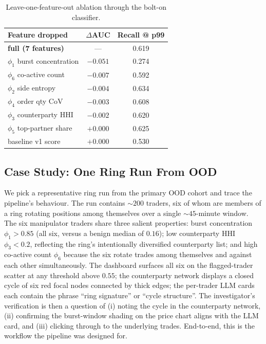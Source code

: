 \documentclass[10pt,twocolumn,letterpaper]{article}
\begin{document}
\begin{table}[t]
\caption{Leave-one-feature-out ablation through the bolt-on classifier.}
\label{tab:abl}
\centering
\footnotesize
\begin{tabular}{lcc}
\toprule
Feature dropped & $\Delta$AUC & Recall @ p99 \\
\midrule
\textbf{full (7 features)} & --- & 0.619 \\
$\phi_1$ burst concentration & $-0.051$ & 0.274 \\
$\phi_6$ co-active count & $-0.007$ & 0.592 \\
$\phi_2$ side entropy & $-0.004$ & 0.634 \\
$\phi_4$ order qty CoV & $-0.003$ & 0.608 \\
$\phi_3$ counterparty HHI & $-0.002$ & 0.620 \\
$\phi_5$ top-partner share & $+0.000$ & 0.625 \\
baseline v1 score & $+0.000$ & 0.530 \\
\bottomrule
\end{tabular}
\end{table}

\subsection{Case Study: One Ring Run From OOD}
\label{sec:case}
We pick a representative ring run from the primary OOD cohort and
trace the pipeline's behaviour. The run contains \(\sim\!200\)
traders, six of whom are members of a ring rotating positions among
themselves over a single \(\sim\!45\)-minute window. The six
manipulator traders share three salient properties: burst
concentration \(\phi_1 > 0.85\) (all six, versus a benign median of
\(0.16\)); low counterparty HHI \(\phi_3 < 0.2\), reflecting the
ring's intentionally diversified counterparty list; and high
co-active count \(\phi_6\) because the six rotate trades among
themselves and against each other simultaneously. The dashboard
surfaces all six on the flagged-trader scatter at any threshold above
\(0.55\); the counterparty network displays a closed cycle of six red
focal nodes connected by thick edges; the per-trader LLM cards each
contain the phrase ``ring signature'' or ``cycle structure''. The
investigator's verification is then a question of (i) noting the
cycle in the counterparty network, (ii) confirming the burst-window
shading on the price chart aligns with the LLM card, and (iii)
clicking through to the underlying trades. End-to-end, this is the
workflow the pipeline was designed for.
\end{document}

